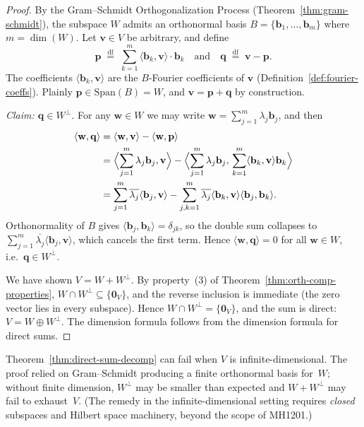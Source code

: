 \documentclass[11pt, a4paper, notitlepage]{report}
\theoremstyle{definition}
\theoremstyle{remark}
\begin{document}
\begin{proof}
By the Gram--Schmidt Orthogonalization Process
(Theorem~\ref{thm:gram-schmidt}), the subspace $W$ admits an orthonormal
basis $B = \{\mathbf{b}_1,\ldots,\mathbf{b}_m\}$ where $m = \dim(W)$.
Let $\mathbf{v}\in V$ be arbitrary, and define
\[
  \mathbf{p} \;\stackrel{\mathrm{df}}{=}\; \sum_{k=1}^{m}\langle\mathbf{b}_k,\mathbf{v}\rangle\cdot\mathbf{b}_k
  \quad\text{and}\quad
  \mathbf{q} \;\stackrel{\mathrm{df}}{=}\; \mathbf{v} - \mathbf{p}.
\]
The coefficients $\langle\mathbf{b}_k,\mathbf{v}\rangle$ are the
$B$-Fourier coefficients of $\mathbf{v}$ (Definition~\ref{def:fourier-coeffs}).
Plainly $\mathbf{p}\in\mathrm{Span}(B) = W$, and $\mathbf{v} = \mathbf{p}+\mathbf{q}$
by construction.

\smallskip
\noindent\textit{Claim: $\mathbf{q}\in W^\perp$.} For any $\mathbf{w}\in W$
we may write $\mathbf{w} = \sum_{j=1}^{m}\lambda_j\mathbf{b}_j$, and then
\begin{align*}
  \langle\mathbf{w},\mathbf{q}\rangle
    &= \langle\mathbf{w},\mathbf{v}\rangle - \langle\mathbf{w},\mathbf{p}\rangle\\
    &= \Bigl\langle\sum_{j=1}^{m}\lambda_j\mathbf{b}_j,\mathbf{v}\Bigr\rangle
       - \Bigl\langle\sum_{j=1}^{m}\lambda_j\mathbf{b}_j,\,\sum_{k=1}^{m}\langle\mathbf{b}_k,\mathbf{v}\rangle\mathbf{b}_k\Bigr\rangle\\
    &= \sum_{j=1}^{m}\overline{\lambda_j}\langle\mathbf{b}_j,\mathbf{v}\rangle
       - \sum_{j,k=1}^{m}\overline{\lambda_j}\langle\mathbf{b}_k,\mathbf{v}\rangle\langle\mathbf{b}_j,\mathbf{b}_k\rangle.
\end{align*}
Orthonormality of $B$ gives $\langle\mathbf{b}_j,\mathbf{b}_k\rangle = \delta_{jk}$,
so the double sum collapses to $\sum_{j=1}^{m}\overline{\lambda_j}\langle\mathbf{b}_j,\mathbf{v}\rangle$,
which cancels the first term. Hence $\langle\mathbf{w},\mathbf{q}\rangle = 0$
for all $\mathbf{w}\in W$, i.e.\ $\mathbf{q}\in W^\perp$.

\smallskip
We have shown $V = W + W^\perp$. By property~(3) of
Theorem~\ref{thm:orth-comp-properties}, $W\cap W^\perp\subseteq\{\mathbf{0}_V\}$,
and the reverse inclusion is immediate (the zero vector lies in every subspace).
Hence $W\cap W^\perp = \{\mathbf{0}_V\}$, and the sum is direct:
$V = W\oplus W^\perp$. The dimension formula follows from the dimension
formula for direct sums.
\end{proof}

\begin{warning}[title={Warning: Finite-Dimensionality is Essential}]
Theorem~\ref{thm:direct-sum-decomp} can fail when $V$ is infinite-dimensional.
The proof relied on Gram--Schmidt producing a finite orthonormal basis for~$W$;
without finite dimension, $W^\perp$ may be smaller than expected and
$W + W^\perp$ may fail to exhaust~$V$. (The remedy in the infinite-dimensional
setting requires \emph{closed} subspaces and Hilbert space machinery, beyond
the scope of MH1201.)
\end{warning}
\end{document}
